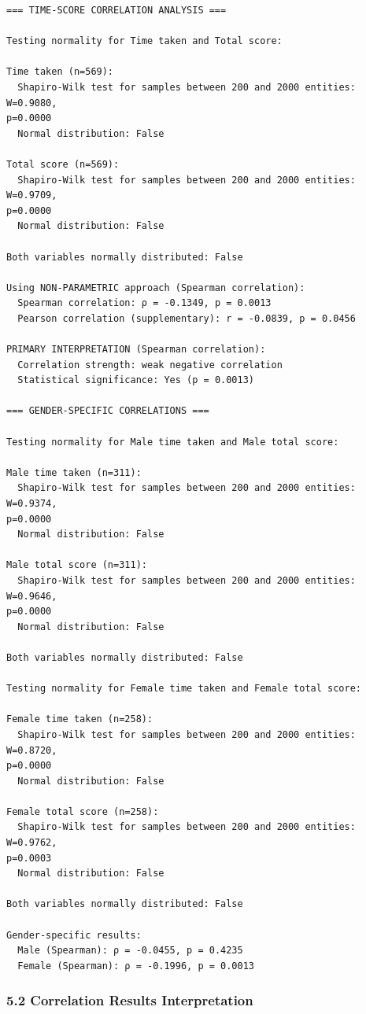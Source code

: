 \documentclass[11pt]{article}
\begin{document}
    \begin{Verbatim}[commandchars=\\\{\}]
=== TIME-SCORE CORRELATION ANALYSIS ===

Testing normality for Time taken and Total score:

Time taken (n=569):
  Shapiro-Wilk test for samples between 200 and 2000 entities: W=0.9080,
p=0.0000
  Normal distribution: False

Total score (n=569):
  Shapiro-Wilk test for samples between 200 and 2000 entities: W=0.9709,
p=0.0000
  Normal distribution: False

Both variables normally distributed: False

Using NON-PARAMETRIC approach (Spearman correlation):
  Spearman correlation: ρ = -0.1349, p = 0.0013
  Pearson correlation (supplementary): r = -0.0839, p = 0.0456

PRIMARY INTERPRETATION (Spearman correlation):
  Correlation strength: weak negative correlation
  Statistical significance: Yes (p = 0.0013)

=== GENDER-SPECIFIC CORRELATIONS ===

Testing normality for Male time taken and Male total score:

Male time taken (n=311):
  Shapiro-Wilk test for samples between 200 and 2000 entities: W=0.9374,
p=0.0000
  Normal distribution: False

Male total score (n=311):
  Shapiro-Wilk test for samples between 200 and 2000 entities: W=0.9646,
p=0.0000
  Normal distribution: False

Both variables normally distributed: False

Testing normality for Female time taken and Female total score:

Female time taken (n=258):
  Shapiro-Wilk test for samples between 200 and 2000 entities: W=0.8720,
p=0.0000
  Normal distribution: False

Female total score (n=258):
  Shapiro-Wilk test for samples between 200 and 2000 entities: W=0.9762,
p=0.0003
  Normal distribution: False

Both variables normally distributed: False

Gender-specific results:
  Male (Spearman): ρ = -0.0455, p = 0.4235
  Female (Spearman): ρ = -0.1996, p = 0.0013
    \end{Verbatim}

    \subsubsection{5.2 Correlation Results
Interpretation}\label{correlation-results-interpretation}
\end{document}
